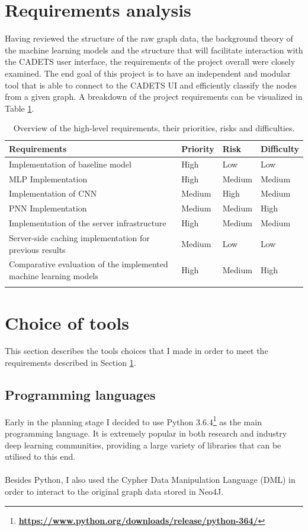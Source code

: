 	\section{Requirements analysis} \label{Section 2.4}
	Having reviewed the structure of the raw graph data, the background theory of the machine learning models and the structure that will facilitate interaction with the CADETS user interface, the requirements of the project overall were closely examined. The end goal of this project is to have an independent and modular tool that is able to connect to the CADETS UI and efficiently classify the nodes from a given graph. A breakdown of the project requirements can be visualized in Table \ref{Table 2.2}.
	\begin{longtable}{|p{}|p{} p{} p{}|}
		\textbf{Requirements} & \textbf{Priority} & \textbf{Risk} & \textbf{Difficulty} \\
		\hline
		Implementation of baseline model & High & Low & Low \\
		MLP Implementation & High & Medium & Medium \\
		Implementation of CNN & Medium & High & Medium \\
		PNN Implementation & Medium & Medium & High \\
		Implementation of the server infrastructure & High & Medium & Medium \\
		Server-side caching implementation for previous results & Medium & Low & Low \\
		Comparative evaluation of the implemented machine learning models & High & Medium & High \\
		\hline
		\caption[Requirements overview]{\centering Overview of the high-level requirements, their priorities, risks and difficulties.}
		\label{Table 2.2}
	\end{longtable}
	\section{Choice of tools} \label{Section 2.5}
	This section describes the tools choices that I made in order to meet the requirements described in Section \ref{Section 2.4}. 
	\subsection{Programming languages} \label{Section 2.5.1}
	Early in the planning stage I decided to use Python 3.6.4\footnote{\textbf{\url{https://www.python.org/downloads/release/python-364/}}} as the main programming language. It is extremely popular in both research and industry deep learning communities, providing a large variety of libraries that can be utilised to this end. 
	\\ \\
	Besides Python, I also used the Cypher Data Manipulation Language (DML) in order to interact to the original graph data stored in Neo4J.  
	
